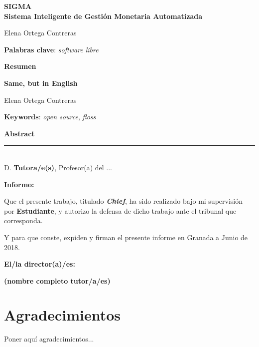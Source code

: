 \thispagestyle{empty}

\begin{center}
{\large\bfseries SIGMA \\ Sistema Inteligente de Gestión Monetaria Automatizada }\\
\end{center}
\begin{center}
Elena Ortega Contreras\\
\end{center}


\vspace{0.5cm}
\noindent\textbf{Palabras clave}: \textit{software libre}
\vspace{0.7cm}

\noindent\textbf{Resumen}\\
	

\cleardoublepage

\begin{center}
	{\large\bfseries Same, but in English}\\
\end{center}
\begin{center}
	Elena Ortega Contreras\\
\end{center}
\vspace{0.5cm}
\noindent\textbf{Keywords}: \textit{open source}, \textit{floss}
\vspace{0.7cm}

\noindent\textbf{Abstract}\\


\cleardoublepage

\thispagestyle{empty}

\noindent\rule[-1ex]{\textwidth}{2pt}\\[4.5ex]

D. \textbf{Tutora/e(s)}, Profesor(a) del ...

\vspace{0.5cm}

\textbf{Informo:}

\vspace{0.5cm}

Que el presente trabajo, titulado \textit{\textbf{Chief}},
ha sido realizado bajo mi supervisión por \textbf{Estudiante}, y autorizo la defensa de dicho trabajo ante el tribunal
que corresponda.

\vspace{0.5cm}

Y para que conste, expiden y firman el presente informe en Granada a Junio de 2018.

\vspace{1cm}

\textbf{El/la director(a)/es: }

\vspace{5cm}

\noindent \textbf{(nombre completo tutor/a/es)}

\chapter*{Agradecimientos}

Poner aquí agradecimientos...

